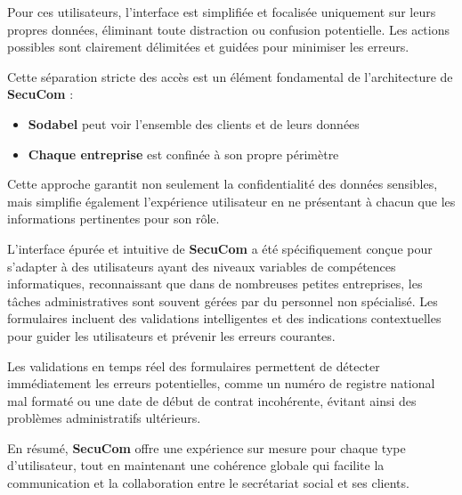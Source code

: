 \vspace{0.5cm}

\noindent Pour ces utilisateurs, l'interface est simplifiée et focalisée uniquement sur leurs propres données, éliminant toute distraction ou confusion potentielle. Les actions possibles sont clairement délimitées et guidées pour minimiser les erreurs.

\begin{tcolorbox}[
  title={\textbf{Séparation des accès}},
  colback=blue!5!white,
  colframe=primarycolor,
  fonttitle=\bfseries,
  boxrule=0.5mm,
  arc=2mm,
  left=6mm,
  right=6mm,
  top=6mm,
  bottom=6mm
]
\noindent Cette séparation stricte des accès est un élément fondamental de l'architecture de \textbf{SecuCom} :
\begin{itemize}[leftmargin=*,label=\textcolor{darkgray}{$\bullet$},itemsep=0.3em]
  \item \textbf{Sodabel} peut voir l'ensemble des clients et de leurs données
  \item \textbf{Chaque entreprise} est confinée à son propre périmètre
\end{itemize}

\noindent Cette approche garantit non seulement la confidentialité des données sensibles, mais simplifie également l'expérience utilisateur en ne présentant à chacun que les informations pertinentes pour son rôle.
\end{tcolorbox}

\vspace{0.5cm}

\noindent L'interface épurée et intuitive de \textbf{SecuCom} a été spécifiquement conçue pour s'adapter à des utilisateurs ayant des niveaux variables de compétences informatiques, reconnaissant que dans de nombreuses petites entreprises, les tâches administratives sont souvent gérées par du personnel non spécialisé. Les formulaires incluent des validations intelligentes et des indications contextuelles pour guider les utilisateurs et prévenir les erreurs courantes.

\begin{note}
Les validations en temps réel des formulaires permettent de détecter immédiatement les erreurs potentielles, comme un numéro de registre national mal formaté ou une date de début de contrat incohérente, évitant ainsi des problèmes administratifs ultérieurs.
\end{note}

\vspace{0.5cm}

\noindent En résumé, \textbf{SecuCom} offre une expérience sur mesure pour chaque type d'utilisateur, tout en maintenant une cohérence globale qui facilite la communication et la collaboration entre le secrétariat social et ses clients.
